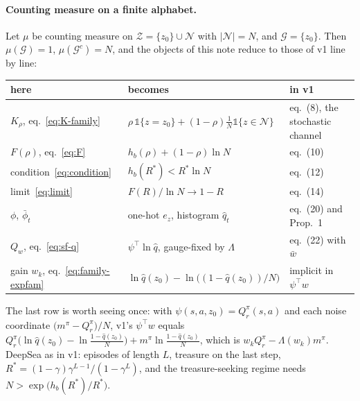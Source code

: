 \documentclass[11pt]{article}
\theoremstyle{remark}
\newcommand{\Zcal}{\mathcal Z}
\newcommand{\Gcal}{\mathcal G}
\newcommand{\Ncal}{\mathcal N}
\newcommand{\1}{\mathds{1}}
\begin{document}
\paragraph{Counting measure on a finite alphabet.}
Let $\mu$ be counting measure on $\Zcal=\{z_0\}\cup\Ncal$ with $|\Ncal|=N$, and $\Gcal=\{z_0\}$.
Then $\mu(\Gcal)=1$, $\mu(\Gcal^c)=N$, and the objects of this note reduce to those of v1 line by line:

\begin{center}
\begin{tabular}{lll}
\toprule
here & becomes & in v1 \\
\midrule
$K_\rho$, eq.~\eqref{eq:K-family} & $\rho\,\1\{z=z_0\}+(1-\rho)\tfrac1N\1\{z\in\Ncal\}$ & eq.~(8), the stochastic channel \\
$F(\rho)$, eq.~\eqref{eq:F} & $h_b(\rho)+(1-\rho)\ln N$ & eq.~(10) \\
condition~\eqref{eq:condition} & $h_b(R^\ast)<R^\ast\ln N$ & eq.~(12) \\
limit~\eqref{eq:limit} & $F(R)/\ln N\to1-R$ & eq.~(14) \\
$\phi$, $\bar\phi_t$ & one-hot $e_z$, histogram $\hat q_t$ & eq.~(20) and Prop.~1 \\
$Q_w$, eq.~\eqref{eq:sf-q} & $\psi^\top\ln\hat q$, gauge-fixed by $\Lambda$ & eq.~(22) with $\bar w$ \\
gain $w_k$, eq.~\eqref{eq:family-expfam} & $\ln\hat q(z_0)-\ln\big((1-\hat q(z_0))/N\big)$ & implicit in $\psi^\top w$ \\
\bottomrule
\end{tabular}
\end{center}

\noindent
The last row is worth seeing once: with $\psi(s,a,z_0)=Q^\pi_r(s,a)$ and each noise coordinate $\big(m^\pi-Q^\pi_r\big)/N$, v1's $\psi^\top w$ equals $Q^\pi_r\big(\ln\hat q(z_0)-\ln\tfrac{1-\hat q(z_0)}{N}\big)+m^\pi\ln\tfrac{1-\hat q(z_0)}{N}$, which is $w_kQ^\pi_r-\Lambda(w_k)m^\pi$.
DeepSea as in v1: episodes of length $L$, treasure on the last step, $R^\ast=(1-\gamma)\gamma^{L-1}/(1-\gamma^L)$, and the treasure-seeking regime needs $N>\exp\big(h_b(R^\ast)/R^\ast\big)$.
\end{document}
